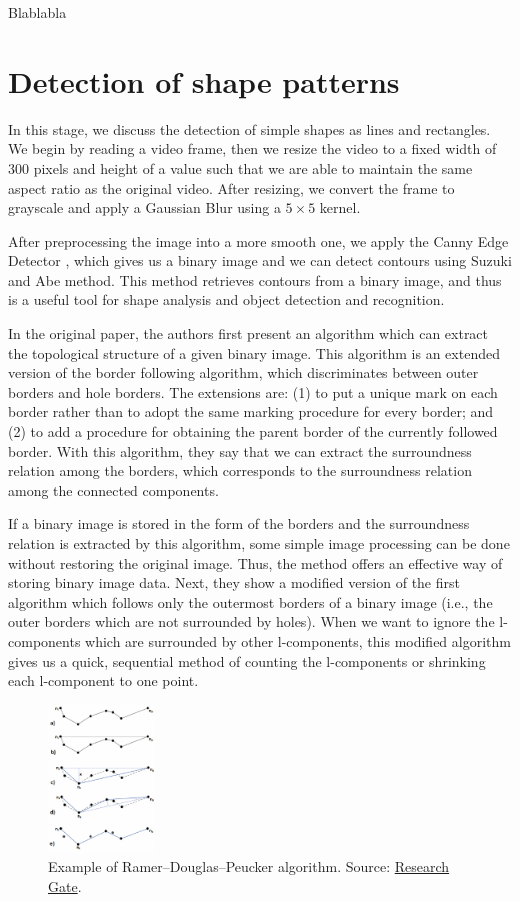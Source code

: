 \documentclass[]{IEEEtran}
\begin{document}
  Blablabla

  \section{Detection of shape patterns}
  In this stage, we discuss the detection of simple shapes as lines and rectangles. We begin by reading a video frame, then we resize the video to a fixed width of $300$ pixels and height of a value such that we are able to maintain the same aspect ratio as the original video. After resizing, we convert the frame to grayscale and apply a Gaussian Blur using a $5 \times 5$ kernel.

  After preprocessing the image into a more smooth one, we apply the Canny Edge Detector \cite{canny}, which gives us a binary image and we can detect contours using Suzuki and Abe method. This method retrieves contours from a binary image, and thus is a useful tool for shape analysis and object detection and recognition.

  In the original paper, the authors first present an algorithm which can extract the topological structure of a given binary image. This algorithm is an extended version of the border following algorithm, which discriminates between outer borders and hole borders. The extensions are: (1) to put a unique mark on each border rather than to adopt the same marking procedure for every border; and (2) to add a procedure for obtaining the parent border of the currently followed border. With this algorithm, they say that we can extract the surroundness relation among the borders, which corresponds to the surroundness relation among the connected components.

  If a binary image is stored in the form of the borders and the surroundness relation is extracted by this algorithm, some simple image processing can be done without restoring the original image. Thus, the method offers an effective way of storing binary image data. Next, they show a modified version of the first algorithm which follows only the outermost borders of a binary image (i.e., the outer borders which are not surrounded by holes). When we want to ignore the l-components which are surrounded by other l-components, this modified algorithm gives us a quick, sequential method of counting the l-components or shrinking each l-component to one point.

   \begin{figure}[h]
   \centering
   \includegraphics[width=0.25\textwidth]{figures/rdp.png}
   \caption{\label{rdp} Example of Ramer–Douglas–Peucker algorithm. Source: \href{https://www.researchgate.net/figure/Input-curve-specified-stages-of-the-Ramer-Douglas-Peucker-algorithm-output-curve-with_fig1_236024099}{Research Gate}.}
  \end{figure}
\end{document}
